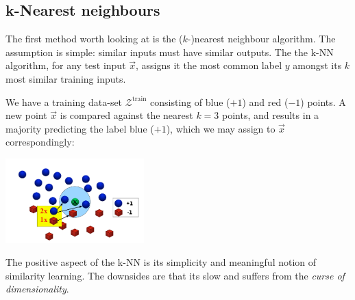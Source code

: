 \documentclass{article}
\begin{document}
\subsection{k-Nearest neighbours}
The first method worth looking at is the ($k$-)nearest neighbour algorithm. The assumption is simple: similar inputs must have similar outputs. The the k-NN algorithm, for any test input $\vec{x}$, assigns it the most common label $y$ amongst its $k$ most similar training inputs.
\begin{testexample}[An illustration in 2-D]
    We have a training data-set $\mathcal{Z}^\text{train}$ consisting of blue ($+1$) and red ($-1$) points. A new point $\vec{x}$ is compared against the nearest $k=3$ points, and results in a majority predicting the label blue ($+1$), which we may assign to $\vec{x}$ correspondingly:
\begin{center}\includegraphics[width=0.4\textwidth]{knnfig.png}\end{center}
\end{testexample}\vspace{-0.3cm}
{\flushleft The} positive aspect of the k-NN is its simplicity and meaningful notion of similarity learning. The downsides are that its slow and suffers from the \textit{curse of dimensionality}.
\end{document}
